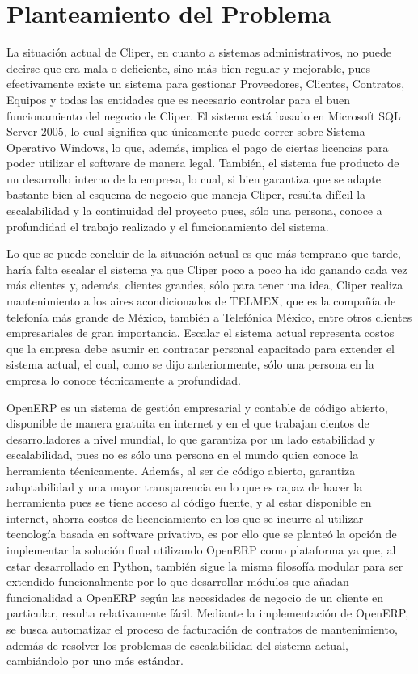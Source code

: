 \documentclass[a4paper, 12pt]{article}
\begin{document}
\section{Planteamiento del Problema}
La situación actual de Cliper, en cuanto a sistemas administrativos, no puede decirse que era mala o deficiente, sino más bien regular y mejorable, pues efectivamente existe un sistema para gestionar Proveedores, Clientes, Contratos, Equipos y todas las entidades que es necesario controlar para el buen funcionamiento del negocio de Cliper. El sistema está basado en Microsoft SQL Server 2005, lo cual significa que únicamente puede correr sobre Sistema Operativo Windows, lo que, además, implica el pago de ciertas licencias para poder utilizar el software de manera legal. También, el sistema fue producto de un desarrollo interno de la empresa, lo cual, si bien garantiza que se adapte bastante bien al esquema de negocio que maneja Cliper, resulta difícil la escalabilidad y la continuidad del proyecto pues, sólo una persona, conoce a profundidad el trabajo realizado y el funcionamiento del sistema.

Lo que se puede concluir de la situación actual es que más temprano que tarde, haría falta escalar el sistema ya que Cliper poco a poco ha ido ganando cada vez más clientes y, además, clientes grandes, sólo para tener una idea, Cliper realiza mantenimiento a los aires acondicionados de TELMEX, que es la compañía de telefonía más grande de México, también a Telefónica México, entre otros clientes empresariales de gran importancia. Escalar el sistema actual representa costos que la empresa debe asumir en contratar personal capacitado para extender el sistema actual, el cual, como se dijo anteriormente, sólo una persona en la empresa lo conoce técnicamente a profundidad. 

OpenERP es un sistema de gestión empresarial y contable de código abierto, disponible de manera gratuita en internet y en el que trabajan cientos de desarrolladores a nivel mundial, lo que garantiza por un lado estabilidad y escalabilidad, pues no es sólo una persona en el mundo quien conoce la herramienta técnicamente. Además, al ser de código abierto, garantiza adaptabilidad y una mayor transparencia en lo que es capaz de hacer la herramienta pues se tiene acceso al código fuente, y al estar disponible en internet, ahorra costos de licenciamiento en los que se incurre al utilizar tecnología basada en software privativo, es por ello que se planteó la opción de implementar la solución final utilizando OpenERP como plataforma ya que, al estar desarrollado en Python, también sigue la misma filosofía modular para ser extendido funcionalmente por lo que desarrollar módulos que añadan funcionalidad a OpenERP según las necesidades de negocio de un cliente en particular, resulta relativamente fácil. Mediante la implementación de OpenERP, se busca automatizar el proceso de facturación de contratos de mantenimiento, además de resolver los problemas de escalabilidad del sistema actual, cambiándolo por uno más estándar.
\end{document}
